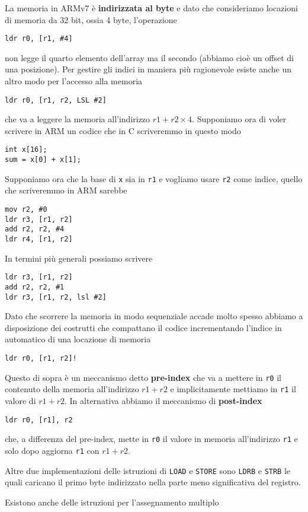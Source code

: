 La memoria in ARMv7 è \textbf{indirizzata al byte} e dato che consideriamo locazioni di memoria da
32 bit, ossia 4 byte, l'operazione
\begin{verbatim}
ldr r0, [r1, #4]
\end{verbatim}
non legge il quarto elemento dell'array ma il secondo (abbiamo cioè un offset di una posizione).
Per gestire gli indici in maniera più ragionevole esiste anche un altro modo per l'accesso alla
memoria
\begin{verbatim}
ldr r0, [r1, r2, LSL #2]
\end{verbatim}
che va a leggere la memoria all'indirizzo $r1 + r2 \times 4$. Supponiamo ora di voler scrivere in
ARM un codice che in C scriveremmo in questo modo
\begin{verbatim}
int x[16];
sum = x[0] + x[1];	
\end{verbatim}
Supponiamo ora che la base di \verb|x| sia in \verb|r1| e vogliamo usare \verb|r2| come indice,
quello che scriveremmo in ARM sarebbe
\begin{verbatim}
mov r2, #0
ldr r3, [r1, r2]
add r2, r2, #4
ldr r4, [r1, r2]
\end{verbatim}
In termini più generali possiamo scrivere
\begin{verbatim}
ldr r3, [r1, r2]
add r2, r2, #1
ldr r3, [r1, r2, lsl #2]
\end{verbatim}
Dato che scorrere la memoria in modo sequenziale accade molto spesso abbiamo a disposizione dei
costrutti che compattano il codice incrementando l'indice in automatico di una locazione di memoria
\begin{verbatim}
ldr r0, [r1, r2]!
\end{verbatim}
Questo di sopra è un meccanismo detto \textbf{pre-index} che va a mettere in \verb|r0| il contenuto
della memoria all'indirizzo $r1 + r2$ e implicitamente mettiamo in \verb|r1| il valore di $r1 + r2$.
In alternativa abbiamo il meccanismo di \textbf{post-index}
\begin{verbatim}
ldr r0, [r1], r2
\end{verbatim}
che, a differenza del pre-index, mette in \verb|r0| il valore in memoria all'indirizzo \verb|r1| e
solo dopo aggiorna \verb|r1| con $r1 + r2$.

Altre due implementazioni delle istruzioni di \verb|LOAD| e \verb|STORE| sono \verb|LDRB| e
\verb|STRB| le quali caricano il primo byte indirizzato nella parte meno significativa del registro.

Esistono anche delle istruzioni per l'assegnamento multiplo